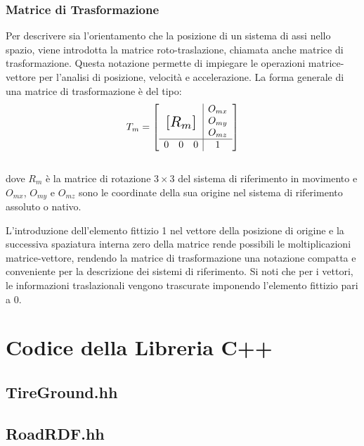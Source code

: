 \subsection{Matrice di Trasformazione}
Per descrivere sia l'orientamento che la posizione di un sistema di assi nello spazio, viene introdotta la matrice roto-traslazione, chiamata anche matrice di trasformazione. Questa notazione permette di impiegare le operazioni matrice-vettore per l'analisi di posizione, velocità e accelerazione. La forma generale di una matrice di trasformazione è del tipo:
%
\begin{equation}
T_m = \left[
\begin{array}{ccc|c}
& & & O_{mx}\\
\multicolumn{3}{c|}{\multirow{3}{*}{\raisebox{20mm}{\scalebox{1.5}{$[R_m]$}}}} & O_{my}\\
& & & O_{mz}\\ \hline
0 & 0 & 0 & 1
\end{array}\right]
\end{equation}\\
%
dove $R_m$ è la matrice di rotazione $3 \times 3$ del sistema di riferimento in movimento e $O_{mx}$, $O_{my}$ e $O_{mz}$ sono le coordinate della sua origine nel sistema di riferimento assoluto o nativo.

L'introduzione dell'elemento fittizio 1 nel vettore della posizione di origine e la successiva spaziatura interna zero della matrice rende possibili le moltiplicazioni matrice-vettore, rendendo la matrice di trasformazione una notazione compatta e conveniente per la descrizione dei sistemi di riferimento. Si noti che per i vettori, le informazioni traslazionali vengono trascurate imponendo l'elemento fittizio pari a 0.
%
\chapter{Codice della Libreria C++}
\label{LibraryCode}
%
\section{TireGround.hh}
\footnotesize
\renewcommand{\baselinestretch}{1.0}

\renewcommand{\baselinestretch}{1.25}
%
\section{RoadRDF.hh}
\renewcommand{\baselinestretch}{1.0}

\renewcommand{\baselinestretch}{1.25}
%
